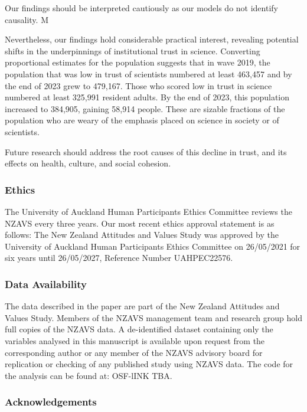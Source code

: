 \documentclass[
  single column]{article}
\begin{document}
Our findings should be interpreted cautiously as our models do not
identify causality. M

Nevertheless, our findings hold considerable practical interest,
revealing potential shifts in the underpinnings of institutional trust
in science. Converting proportional estimates for the population
suggests that in wave 2019, the population that was low in trust of
scientists numbered at least 463,457 and by the end of 2023 grew to
479,167. Those who scored low in trust in science numbered at least
325,991 resident adults. By the end of 2023, this population increased
to 384,905, gaining 58,914 people. These are sizable fractions of the
population who are weary of the emphasis placed on science in society or
of scientists.

Future research should address the root causes of this decline in trust,
and its effects on health, culture, and social cohesion.

\newpage{}

\subsubsection{Ethics}\label{ethics}

The University of Auckland Human Participants Ethics Committee reviews
the NZAVS every three years. Our most recent ethics approval statement
is as follows: The New Zealand Attitudes and Values Study was approved
by the University of Auckland Human Participants Ethics Committee on
26/05/2021 for six years until 26/05/2027, Reference Number UAHPEC22576.

\subsubsection{Data Availability}\label{data-availability}

The data described in the paper are part of the New Zealand Attitudes
and Values Study. Members of the NZAVS management team and research
group hold full copies of the NZAVS data. A de-identified dataset
containing only the variables analysed in this manuscript is available
upon request from the corresponding author or any member of the NZAVS
advisory board for replication or checking of any published study using
NZAVS data. The code for the analysis can be found at: OSF-lINK TBA.

\subsubsection{Acknowledgements}\label{acknowledgements}
\end{document}
